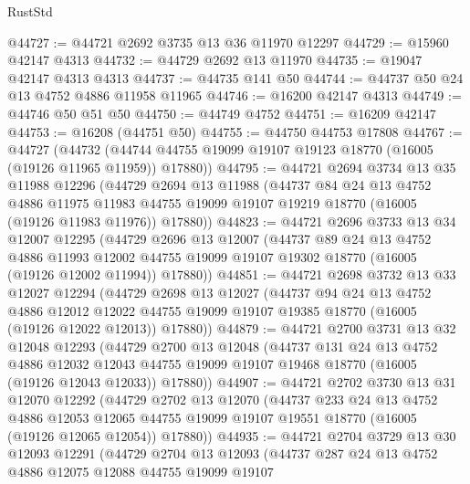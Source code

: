 \begin{lexlean}{RustStd}
\begin{coremodule}
@44727 := @44721 @2692 @3735 @13 @36 @11970 @12297
@44729 := @15960 @42147 @4313
@44732 := @44729 @2692 @13 @11970
@44735 := @19047 @42147 @4313 @4313
@44737 := @44735 @141 @50
@44744 := @44737 @50 @24 @13 @4752 @4886 @11958 @11965
@44746 := @16200 @42147 @4313
@44749 := @44746 @50 @51 @50
@44750 := @44749 @4752
@44751 := @16209 @42147
@44753 := @16208 (@44751 @50)
@44755 := @44750 @44753 @17808
@44767 := @44727
    (@44732 (@44744 @44755 @19099 @19107 @19123 @18770 (@16005 (@19126 @11965 @11959)) @17880))
@44795 := @44721
    @2694
    @3734
    @13
    @35
    @11988
    @12296
    (@44729
      @2694
      @13
      @11988
      (@44737
        @84
        @24
        @13
        @4752
        @4886
        @11975
        @11983
        @44755
        @19099
        @19107
        @19219
        @18770
        (@16005 (@19126 @11983 @11976))
        @17880))
@44823 := @44721
    @2696
    @3733
    @13
    @34
    @12007
    @12295
    (@44729
      @2696
      @13
      @12007
      (@44737
        @89
        @24
        @13
        @4752
        @4886
        @11993
        @12002
        @44755
        @19099
        @19107
        @19302
        @18770
        (@16005 (@19126 @12002 @11994))
        @17880))
@44851 := @44721
    @2698
    @3732
    @13
    @33
    @12027
    @12294
    (@44729
      @2698
      @13
      @12027
      (@44737
        @94
        @24
        @13
        @4752
        @4886
        @12012
        @12022
        @44755
        @19099
        @19107
        @19385
        @18770
        (@16005 (@19126 @12022 @12013))
        @17880))
@44879 := @44721
    @2700
    @3731
    @13
    @32
    @12048
    @12293
    (@44729
      @2700
      @13
      @12048
      (@44737
        @131
        @24
        @13
        @4752
        @4886
        @12032
        @12043
        @44755
        @19099
        @19107
        @19468
        @18770
        (@16005 (@19126 @12043 @12033))
        @17880))
@44907 := @44721
    @2702
    @3730
    @13
    @31
    @12070
    @12292
    (@44729
      @2702
      @13
      @12070
      (@44737
        @233
        @24
        @13
        @4752
        @4886
        @12053
        @12065
        @44755
        @19099
        @19107
        @19551
        @18770
        (@16005 (@19126 @12065 @12054))
        @17880))
@44935 := @44721
    @2704
    @3729
    @13
    @30
    @12093
    @12291
    (@44729
      @2704
      @13
      @12093
      (@44737
        @287
        @24
        @13
        @4752
        @4886
        @12075
        @12088
        @44755
        @19099
        @19107

\end{coremodule}
\end{lexlean}
